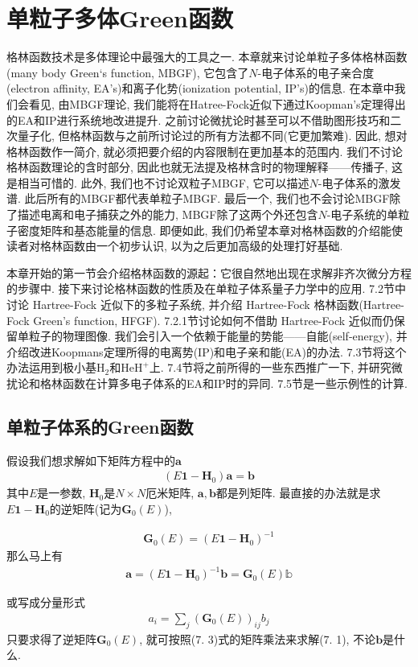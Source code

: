 \chapter{单粒子多体Green函数}
格林函数技术是多体理论中最强大的工具之一. 
本章就来讨论单粒子多体格林函数(many body Green`s function, 
MBGF), 
它包含了$N$-电子体系的电子亲合度(electron affinity, 
EA's)和离子化势(ionization potential, 
IP's)的信息. 
在本章中我们会看见, 
由MBGF理论, 
我们能将在Hatree-Fock近似下通过Koopman's定理得出的EA和IP进行系统地改进提升. 
之前讨论微扰论时甚至可以不借助图形技巧和二次量子化, 
但格林函数与之前所讨论过的所有方法都不同(它更加繁难). 
因此, 
想对格林函数作一简介, 
就必须把要介绍的内容限制在更加基本的范围内. 
我们不讨论格林函数理论的含时部分, 
因此也就无法提及格林含时的物理解释——传播子, 
这是相当可惜的. 
此外, 
我们也不讨论双粒子MBGF, 
它可以描述$N$-电子体系的激发谱. 
此后所有的MBGF都代表单粒子MBGF. 
最后一个, 
我们也不会讨论MBGF除了描述电离和电子捕获之外的能力, 
MBGF除了这两个外还包含$N$-电子系统的单粒子密度矩阵和基态能量的信息. 
即便如此, 
我们仍希望本章对格林函数的介绍能使读者对格林函数由一个初步认识, 
以为之后更加高级的处理打好基础.


本章开始的第一节会介绍格林函数的源起：它很自然地出现在求解非齐次微分方程的步骤中. 
接下来讨论格林函数的性质及在单粒子体系量子力学中的应用. 
7.2节中讨论 Hartree-Fock 近似下的多粒子系统, 
并介绍 Hartree-Fock 格林函数(Hartree-Fock Green's function, 
HFGF). 
7.2.1节讨论如何不借助 Hartree-Fock 近似而仍保留单粒子的物理图像. 
我们会引入一个依赖于能量的势能——自能(self-energy), 
并介绍改进Koopmans定理所得的电离势(IP)和电子亲和能(EA)的办法. 
7.3节将这个办法运用到极小基$\mathrm{H}_2$和$\mathrm{HeH}^+$上. 
7.4节将之前所得的一些东西推广一下, 
并研究微扰论和格林函数在计算多电子体系的EA和IP时的异同. 
7.5节是一些示例性的计算.

\section{单粒子体系的Green函数}
假设我们想求解如下矩阵方程中的$\mathbf{a}$
\begin{align}
(E\mathbf{1} - \mathbf{H}_0)\mathbf{a} = \mathbf{b}
\end{align}
其中$E$是一参数, 
$\mathbf{H}_0$是$N\times N$厄米矩阵, 
$\mathbf{a,b}$都是列矩阵. 
最直接的办法就是求$E\mathbf{1} - \mathbf{H}_0$的逆矩阵(记为$\mathbf{G}_0(E)$),

\begin{align}
\mathbf{G}_0(E) = (E\mathbf{1} - \mathbf{H}_0)^{-1}
\end{align}
那么马上有
\begin{align}
\mathbf{a} = (E\mathbf{1} - \mathbf{H}_0)^{-1}\mathbf{b} = \mathbf{G}_0(E)\mathbb{b}\tag{7.3a}
\end{align}
\addtocounter{equation}{1}
或写成分量形式
\begin{align}
a_i = \sum_j (\mathbf{G}_0(E))_{ij}b_j\tag{7.3b}
\end{align}
只要求得了逆矩阵$\mathbf{G}_0(E)$, 
就可按照(7.
3)式的矩阵乘法来求解(7.
1), 
不论$\mathbf{b}$是什么.

